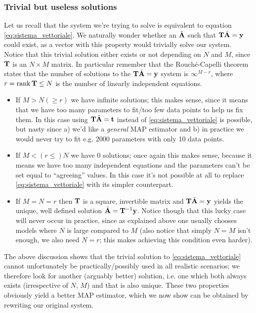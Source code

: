 \documentclass[a4paper]{article}
\newcommand{\mat}[1]{\vb{#1}}
\begin{document}
\subsubsection{Trivial but useless solutions}
Let us recall that the system we're trying to solve is equivalent to equation \eqref{eq:sistema_vettoriale}. We naturally wonder whether an $\Tilde{\vb{A}}$ such that $\mat{T}\Tilde{\vb{A}} = \vb{y}$ could exist, as a vector with this property would trivially solve our system. Notice that this trivial solution either exists or not depending on $N$ and $M$, since $\mat{T}$ is an $N\times M$ matrix. In particular remember that the Rouché-Capelli theorem states that the number of solutions to the $\mat{T}\Tilde{\vb{A}} = \vb{y}$ system is $\infty^{M-r}$, where $r = \rank\mat{T} \leq N$ is the number of linearly independent equations.
\begin{itemize}
    \item If $M > N (\geq r)$ we have infinite solutions; this makes sense, since it means that we have too many parameters to fit/too few data points to help us fix them. In this case using $\mat{T}\Tilde{\vb{A}}=\vb{t}$ instead of \eqref{eq:sistema_vettoriale} is possible, but nasty since a) we'd like a \emph{general} MAP estimator and b) in practice we would never try to fit e.g. 2000 parameters with only 10 data points.
    \item If $M < (r \leq) N$ we have 0 solutions; once again this makes sense, because it means we have too many independent equations and the parameters can't be set equal to ``agreeing'' values. In this case it's not possible at all to replace \eqref{eq:sistema_vettoriale} with its simpler counterpart.
    \item If $M = N = r$ then $\mat{T}$ is a square, invertible matrix and $\mat{T}\Tilde{\vb{A}}=\vb{y}$ yields the unique, well defined solution $\Tilde{\vb{A}} = \mat{T}^{-1}\vb{y}$. Notice though that this lucky case will never occur in practice, since as explained above one usually chooses models where $N$ is large compared to $M$ (also notice that simply $N=M$ isn't enough, we also need $N=r$; this makes achieving this condition even harder).
\end{itemize}
The above discussion shows that the trivial solution to \eqref{eq:sistema_vettoriale} cannot unfortunately be practically/possibly used in all realistic scenarios; we therefore look for another (arguably better) solution, i.e. one which both always exists (irrespective of $N$, $M$) and that is also unique. These two properties obviously yield a better MAP estimator, which we now show can be obtained by rewriting our original system.
\end{document}
